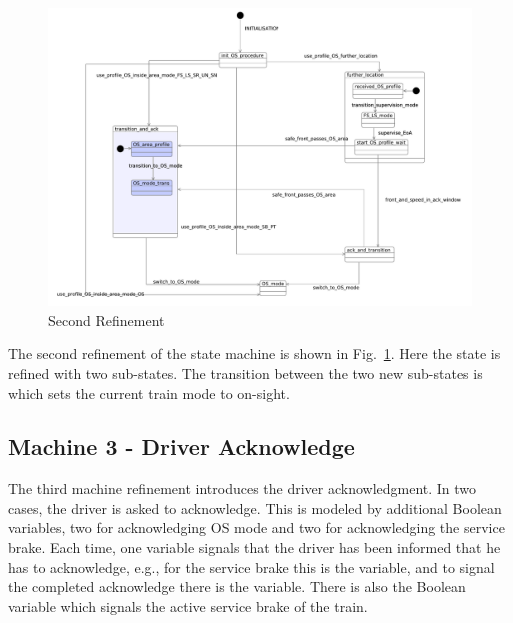 \documentclass{template/openetcs_article}
\begin{document}
\begin{figure}[ht]
  \centering
  \includegraphics[width=.95\textwidth]{m2_mode_profile_on_sight_procedure}
  \caption{Second Refinement}
  \label{fig:second-refinement}
\end{figure}

The second refinement of the state machine is shown in
Fig.~\ref{fig:second-refinement}. Here the state  is
refined with two sub-states. The transition between the two new sub-states
is  which sets the current train mode to
on-sight.

{\footnotesize

}

\subsection{Machine 3 - Driver Acknowledge}
\label{sec:machine-3-driver}

The third machine refinement introduces the driver acknowledgment. In two cases,
the driver is asked to acknowledge. This is modeled by additional Boolean
variables, two for acknowledging OS mode and two for acknowledging the service
brake. Each time, one variable signals that the driver has been informed that he
has to acknowledge, e.g., for the service brake this is the
 variable, and to signal the
completed acknowledge there is the 
variable. There is also the Boolean variable  which signals
the active service brake of the train.
\end{document}
